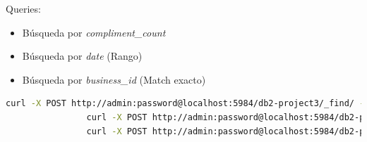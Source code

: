 \documentclass{article}
\begin{document}
		Queries:
		\begin{itemize}
			\item Búsqueda por \textit{compliment_count}
			\item Búsqueda por \textit{date} (Rango)
			\item Búsqueda por \textit{business_id} (Match exacto)
		\end{itemize}
		\begin{lstlisting}[language = bash, gobble = 28]
				curl -X POST http://admin:password@localhost:5984/db2-project3/_find/ -d '{ "selector": { "compliment_count": { "$gt": 5 } } }' -H "Content-Type:application/json"
				curl -X POST http://admin:password@localhost:5984/db2-project3/_find/ -d '{ "selector": { "date": { "$gt": "2012-02-06 01:30:34", "$lt": "2012-02-08 06:40:50" } } }' -H "Content-Type:application/json"
				curl -X POST http://admin:password@localhost:5984/db2-project3/_find/ -d '{ "selector": { "business_id": { "$eq": "UOST50KiVrSFTPMXGH9njg" } } }' -H "Content-Type:application/json"
		\end{lstlisting}
\end{document}
